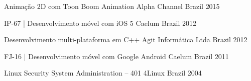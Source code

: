 

\begin{cventries}


  \cventry
    {Animação 2D com Toon Boom Animation} %
    {Alpha Channel} %
    {Brazil} %
    {2015} %
    {}

  \cventry
    {IP-67 | Desenvolvimento móvel com iOS 5} %
    {Caelum} %
    {Brazil} %
    {2012} %
    {}


  \cventry
    {Desenvolvimento multi-plataforma em C++} %
    {Agit Informática Ltda} %
    {Brazil} %
    {2012} %
    {}

  \cventry
    {FJ-16 | Desenvolvimento móvel com Google Android} %
    {Caelum} %
    {Brazil} %
    {2011} %
    {
    }

  \cventry
    {Linux Security System Administration – 401} %
    {4Linux} %
    {Brazil} %
    {2004} %
    {}


\end{cventries}
